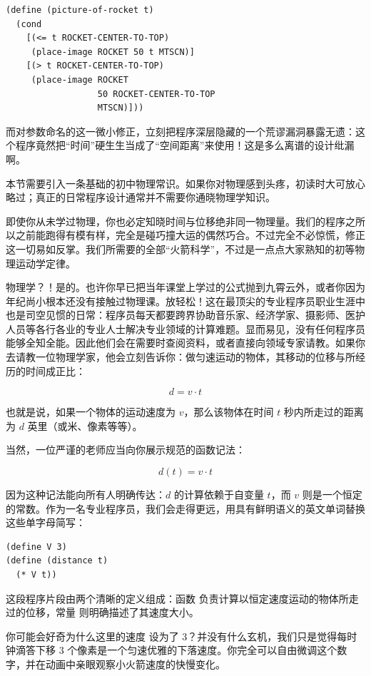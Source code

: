 \begin{lstlisting}[language=BSL]
(define (picture-of-rocket t)
  (cond
    [(<= t ROCKET-CENTER-TO-TOP)
     (place-image ROCKET 50 t MTSCN)]
    [(> t ROCKET-CENTER-TO-TOP)
     (place-image ROCKET
                  50 ROCKET-CENTER-TO-TOP
                  MTSCN)]))
\end{lstlisting}

而对参数命名的这一微小修正，立刻把程序深层隐藏的一个荒谬漏洞暴露无遗：这个程序竟然把“时间”硬生生当成了“空间距离”来使用！这是多么离谱的设计纰漏啊。

\begin{notebox}[危险预警]
本节需要引入一条基础的初中物理常识。如果你对物理感到头疼，初读时大可放心略过；真正的日常程序设计通常并不需要你通晓物理学知识。
\end{notebox}

即使你从未学过物理，你也必定知晓时间与位移绝非同一物理量。我们的程序之所以之前能跑得有模有样，完全是碰巧撞大运的偶然巧合。不过完全不必惊慌，修正这一切易如反掌。我们所需要的全部“火箭科学”，不过是一点点大家熟知的初等物理运动学定律。

物理学？！是的。也许你早已把当年课堂上学过的公式抛到九霄云外，或者你因为年纪尚小根本还没有接触过物理课。放轻松！这在最顶尖的专业程序员职业生涯中也是司空见惯的日常：程序员每天都要跨界协助音乐家、经济学家、摄影师、医护人员等各行各业的专业人士解决专业领域的计算难题。显而易见，没有任何程序员能够全知全能。因此他们会在需要时查阅资料，或者直接向领域专家请教。如果你去请教一位物理学家，他会立刻告诉你：做匀速运动的物体，其移动的位移与所经历的时间成正比：

\[
  d = v \cdot t
\]

也就是说，如果一个物体的运动速度为 $v$，那么该物体在时间 $t$ 秒内所走过的距离为 $d$ 英里（或米、像素等等）。

当然，一位严谨的老师应当向你展示规范的函数记法：

\[
  d(t) = v \cdot t
\]

因为这种记法能向所有人明确传达：$d$ 的计算依赖于自变量 $t$，而 $v$ 则是一个恒定的常数。作为一名专业程序员，我们会走得更远，用具有鲜明语义的英文单词替换这些单字母简写：
\begin{lstlisting}[language=BSL]
(define V 3)
(define (distance t)
  (* V t))
\end{lstlisting}

这段程序片段由两个清晰的定义组成：函数  负责计算以恒定速度运动的物体所走过的位移，常量  则明确描述了其速度大小。

你可能会好奇为什么这里的速度  设为了 3？并没有什么玄机，我们只是觉得每时钟滴答下移 3 个像素是一个匀速优雅的下落速度。你完全可以自由微调这个数字，并在动画中亲眼观察小火箭速度的快慢变化。

